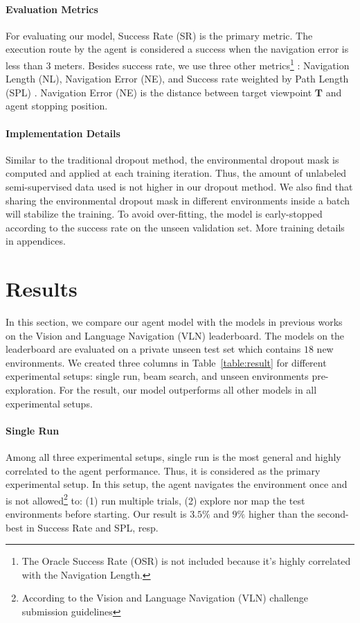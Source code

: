 \documentclass[11pt,a4paper]{article}
\begin{document}
\paragraph{Evaluation Metrics}
For evaluating our model, Success Rate (SR) is the primary metric. 
The execution route by the agent is considered a success when the navigation error is less than $3$ meters. 
Besides success rate, we use three other metrics\footnote{
The Oracle Success Rate (OSR) is not included because it's highly correlated with the Navigation Length.
}
: Navigation Length (NL), Navigation Error (NE),  and Success rate weighted by Path Length (SPL) \cite{anderson2018evaluation}.
Navigation Error (NE) is the distance between target viewpoint $\mathbf{T}$ and agent stopping position.

\paragraph{Implementation Details}
\label{sec:train_detail}
Similar to the traditional dropout method, the environmental dropout mask is computed and applied at each training iteration.
Thus, the amount of unlabeled semi-supervised data used is not higher in our dropout method.
We also find that sharing the environmental dropout mask in different environments inside a batch will stabilize the training.
To avoid over-fitting, the model is early-stopped according to the success rate on the unseen validation set. More training details in appendices. \section{Results}
\label{sec:result}
In this section, we compare our agent model with the models in previous works on the Vision and Language Navigation (VLN) leaderboard.
The models on the leaderboard are evaluated on a private unseen test set which contains $18$ new environments.
We created three columns in Table~\ref{table:result} for different experimental setups: single run, beam search, and unseen environments pre-exploration. 
For the result, our model outperforms all other models in all experimental setups.

\paragraph{Single Run}
Among all three experimental setups, single run is the most general and highly correlated to the agent performance. Thus, it is considered as the primary experimental setup.
In this setup, the agent navigates the environment once and is not allowed\footnote{According to the Vision and Language Navigation (VLN) challenge submission guidelines} to:
(1) run multiple trials,
(2) explore nor map the test environments before starting.
Our result is $3.5\%$ and $9\%$ higher than the second-best in Success Rate and SPL, resp. 
\end{document}
